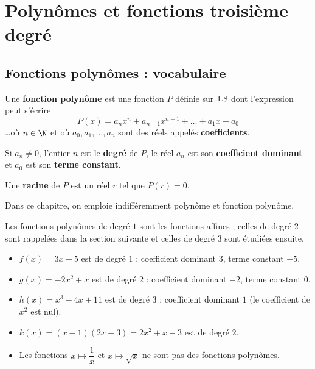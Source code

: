 \chapter{Polynômes et fonctions troisième degré}

\section{Fonctions polynômes : vocabulaire}

\begin{defin}
	Une \textbf{fonction polynôme} est une fonction $P$ définie sur $1.8$ dont l'expression peut s'écrire
	\[
		P(x) = a_n x^n + a_{n-1} x^{n-1} + \dots + a_1 x + a_0
	\]
	\ldots où $n \in \N$ et où $a_0, a_1, \dots, a_n$ sont des réels appelés \textbf{coefficients}.

	Si $a_n \neq 0$, l'entier $n$ est le \textbf{degré} de $P$, le réel $a_n$ est son \textbf{coefficient dominant} et $a_0$ est son \textbf{terme constant}.

	Une \textbf{racine} de $P$ est un réel $r$ tel que $P(r) = 0$.
\end{defin}

\begin{rem}
	Dans ce chapitre, on emploie indifféremment \og polynôme\fg{} et \og fonction polynôme\fg{}.

	Les fonctions polynômes de degré $1$ sont les fonctions affines ; celles de degré $2$ sont rappelées dans la section suivante et celles de degré $3$ sont étudiées ensuite.
\end{rem}

\begin{ex}
	\nline
	\begin{itemize}
		\item $f(x) = 3x - 5$ est de degré $1$ : coefficient dominant $3$, terme constant $-5$.
		\item $g(x) = -2x^2 + x$ est de degré $2$ : coefficient dominant $-2$, terme constant $0$.
		\item $h(x) = x^3 - 4x + 11$ est de degré $3$ : coefficient dominant $1$ (le coefficient de $x^2$ est nul).
		\item $k(x) = (x-1)(2x+3) = 2x^2 + x - 3$ est de degré $2$.
		\item Les fonctions $x \mapsto \dfrac{1}{x}$ et $x \mapsto \sqrt{x}$ ne sont pas des fonctions polynômes.
	\end{itemize}
\end{ex}

